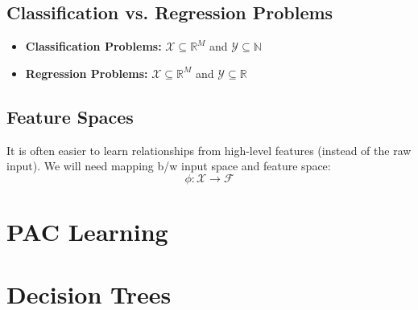 \documentclass{article}
\begin{document}
\subsection{Classification vs. Regression Problems}
\begin{definition}
    \begin{itemize}
        \item \textbf{Classification Problems:} $\mathcal{X} \subseteq \mathbb{R}^M$ and $\mathcal{Y} \subseteq \mathbb{N}$
        \item \textbf{Regression Problems:} $\mathcal{X} \subseteq \mathbb{R}^M$ and $\mathcal{Y} \subseteq \mathbb{R}$
    \end{itemize}
\end{definition}

\subsection{Feature Spaces}
\begin{definition}
    It is often easier to learn relationships from high-level features (instead of the raw input). We will need mapping b/w input space and feature space:
    $$\phi: \mathcal{X} \rightarrow \mathcal{F}$$
\end{definition}

\section{PAC Learning}


\section{Decision Trees}

\end{document}
